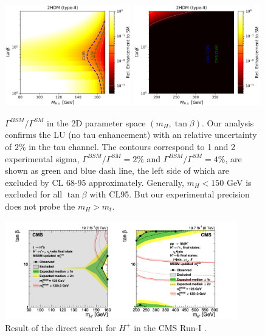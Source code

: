 \begin{figure}[ht]
    \centering
    \includegraphics[width=0.49\textwidth]{chapters/RelatedWorks/sectionBSM/figures/RelEnhance2.png}
    \includegraphics[width=0.49\textwidth]{chapters/RelatedWorks/sectionBSM/figures/RelEnhance2_heavy.png}
    \caption{$\Gamma^{BSM}/\Gamma^{SM}$  in the 2D parameter space $(m_H, \tan\beta)$. Our analysis confirms the LU (no tau enhancement) with an relative uncertainty of $2\%$ in the tau channel. The contours correspond to 1 and 2 experimental sigma, $\Gamma^{BSM}/\Gamma^{SM} = 2\%$ and $\Gamma^{BSM}/\Gamma^{SM} = 4\%$, are shown as green and blue dash line, the left side of which are excluded by CL 68-95 approximately. Generally, $m_H < 150$ GeV is excluded for all $\tan\beta$ with CL95. But our experimental precision does not probe the $m_H >m_t$.  }
    \label{fig:relatedWorks:bsm:chargedHiggs:relEnahnce2d}
\end{figure}

\begin{figure}[ht]
    \centering
    \includegraphics[width=0.9\textwidth]{chapters/RelatedWorks/sectionBSM/figures/2HDM_search.png}
    \caption{Result of the direct search for $H^+$ in the CMS Run-I \cite{Khachatryan:2015qxa}. }
    \label{fig:relatedWorks:bsm:chargedHiggs:directsearch}
\end{figure}



